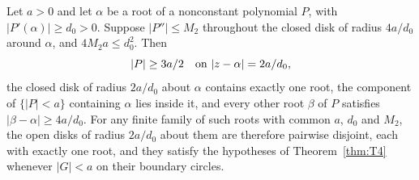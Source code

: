 \begin{lemma}
\label{lem:isolation-interface}
Let $a>0$ and let $\alpha$ be a root of a nonconstant polynomial $P$, with
$|P'(\alpha)|\geq d_0>0$.  Suppose
$|P''|\leq M_2$ throughout the closed disk of radius $4a/d_0$
around $\alpha$, and $4M_2a\leq d_0^2$.  Then
\[
 |P|\geq3a/2\quad\hbox{on }|z-\alpha|=2a/d_0,
\]
the closed disk of radius $2a/d_0$ about $\alpha$ contains exactly one
root, the component of $\{|P|<a\}$ containing $\alpha$ lies inside it, and
every other root $\beta$ of $P$ satisfies $|\beta-\alpha|\ge4a/d_0$.
For any finite family of such roots with common $a$, $d_0$ and $M_2$,
the open disks of
radius $2a/d_0$ about them are therefore pairwise disjoint, each with
exactly one root, and they satisfy the hypotheses of
Theorem~\ref{thm:T4} whenever $|G|<a$ on their boundary circles.
\end{lemma}

